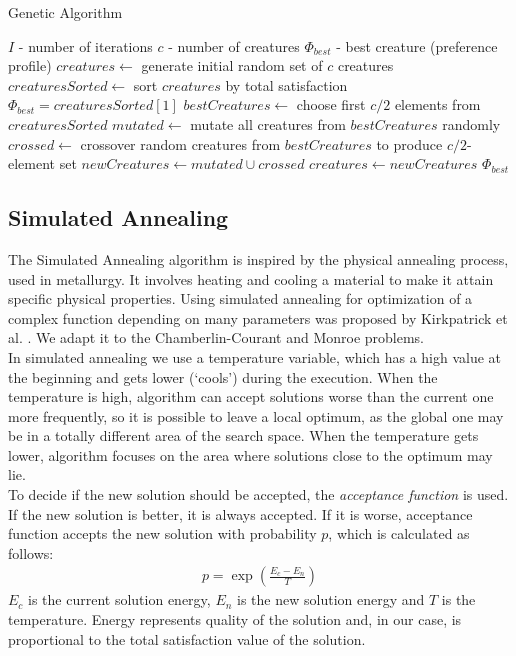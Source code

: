 \begin{algorithm}
\caption{Genetic Algorithm}\label{euclid}
\begin{algorithmic}[1]
		\State $I$ - number of iterations
		\State $c$ - number of creatures
		\State $\Phi_{best}$ - best creature (preference profile)
		\State $creatures \gets$ generate initial random set of $c$ creatures
			\State $creaturesSorted \gets$ sort $creatures$ by total satisfaction
				\State $\Phi_{best} = creaturesSorted[1]$
			\EndIf
			\State $bestCreatures \gets$ choose first $c/2$ elements from $creaturesSorted$
			\State $mutated \gets$ mutate all creatures from $bestCreatures$ randomly
			\State $crossed \gets$ crossover random creatures from $bestCreatures$ to produce $c/2$-element set
			\State $newCreatures \gets mutated \cup crossed$
			\State $creatures \gets newCreatures$
		\EndFor
		\State \Return $\Phi_{best}$
	\EndProcedure
\end{algorithmic}
\end{algorithm}

\subsection{Simulated Annealing}

The Simulated Annealing algorithm is inspired by the physical annealing process, used in metallurgy. It involves heating and cooling a material to make it attain specific physical properties. Using simulated annealing for optimization of a complex function depending on many parameters was proposed by Kirkpatrick et al. \cite{7}. We adapt it to the Chamberlin-Courant and Monroe problems.
\\

In simulated annealing we use a temperature variable, which has a high value at the beginning and gets lower (`cools') during the execution. When the temperature is high, algorithm can accept solutions worse than the current one more frequently, so it is possible to leave a local optimum, as the global one may be in a totally different area of the search space. When the temperature gets lower, algorithm focuses on the area where solutions close to the optimum may lie.
\\

To decide if the new solution should be accepted, the \textit{acceptance function} is used. If the new solution is better, it is always accepted. If it is worse, acceptance function accepts the new solution with probability $p$, which is calculated as follows:
\begin{gather}
	p = \exp(\frac{E_{c}-E_{n}}{T})
\end{gather}
$E_{c}$ is the current solution energy, $E_{n}$ is the new solution energy and $T$ is the temperature. Energy represents quality of the solution and, in our case, is proportional to the total satisfaction value of the solution.
\\


